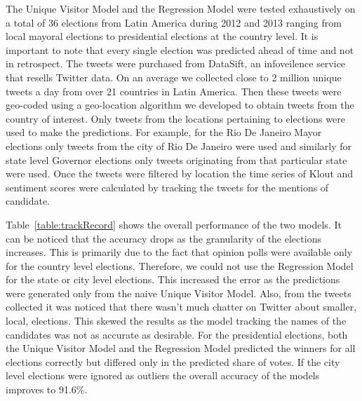 The Unique Visitor Model and the Regression Model were tested exhaustively on a total of 36 elections from Latin America during 2012 and 2013 ranging from local mayoral elections to presidential elections at the country level.
It is important to note that every single election was predicted ahead of time and not in retrospect.
The tweets were purchased from DataSift, an infoveilence service that resells Twitter data.
On an average we collected close to 2 million unique tweets a day from over 21 countries in Latin America.
Then these tweets were geo-coded using a geo-location algorithm we developed to obtain tweets from the country of interest.
Only tweets from the locations pertaining to elections were used to make the predictions.
For example, for the Rio De Janeiro Mayor elections only tweets from the city of Rio De Janeiro were used and similarly for state level Governor elections only tweets originating from that particular state were used.
Once the tweets were filtered by location the time series of Klout and sentiment scores were calculated by tracking the tweets for the mentions of candidate.

Table~\ref{table:trackRecord} shows the overall performance of the two models.
It can be noticed that the accuracy drops as the granularity of the elections increases. 
This is primarily due to the fact that opinion polls were available only for the country level elections.
Therefore, we could not use the Regression Model for the state or city level elections.
This increased the error as the predictions were generated only from the naive Unique Visitor Model.
Also, from the tweets collected it was noticed that there wasn't much chatter on Twitter about 
smaller, local, elections.
This skewed the results as the model tracking the names of the candidates was not as accurate as desirable.
For the presidential elections, both the Unique Visitor Model and the Regression Model predicted the winners for all elections correctly but differed only in the predicted share of votes.
If the city level elections were ignored as outliers the overall accuracy of the models improves to 91.6\%.